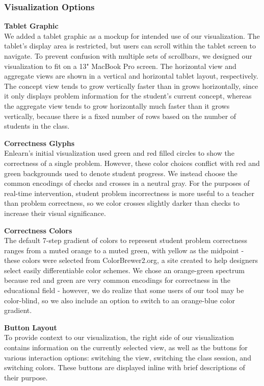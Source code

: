 \documentclass{sigchi}
\begin{document}
\subsubsection{Visualization Options}

{\bf Tablet Graphic}\\
We added a tablet graphic as a mockup for intended use of our visualization. The tablet's display area is restricted, but users can scroll within the tablet screen to navigate. To prevent confusion with multiple sets of scrollbars, we designed our visualization to fit on a 13" MacBook Pro screen. The horizontal view and aggregate views are shown in a vertical and horizontal tablet layout, respectively. The concept view tends to grow vertically faster than in grows horizontally, since it only displays problem information for the student's current concept, whereas the aggregate view tends to grow horizontally much faster than it grows vertically, because there is a fixed number of rows based on the number of students in the class.

{\bf Correctness Glyphs}\\
Enlearn's initial visualization used green and red filled circles to show the correctness of a single problem. However, these color choices conflict with red and green backgrounds used to denote student progress. We instead choose the common encodings of checks and crosses in a neutral gray. For the purposes of real-time
intervention, student problem incorrectness is more useful to a teacher than problem correctness, so we color crosses slightly darker than checks to increase their visual significance.

{\bf Correctness Colors}\\
The default 7-step gradient of colors to represent student problem correctness ranges from a muted orange to a muted green, with yellow as the midpoint - these colors were selected from ColorBrewer2.org, a site created to help designers select easily differentiable color schemes. We chose an orange-green spectrum because red and green are very common encodings for correctness in the educational field - however, we do realize that some users of our tool may be color-blind, so we also include an option to switch to an orange-blue color gradient.

{\bf Button Layout}\\
To provide context to our visualization, the right side of our visualization contains information on the currently selected view, as well as the buttons for various interaction options: switching the view, switching the class session, and switching colors. These buttons are displayed inline with brief descriptions of their purpose.
\end{document}
